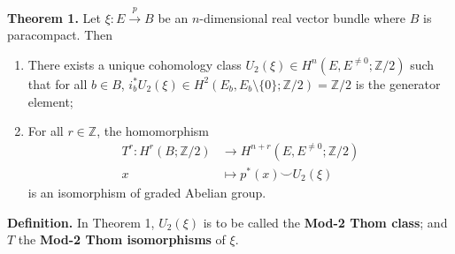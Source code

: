 \documentclass[10pt]{article}
\begin{document}
\textbf{Theorem 1.} Let $\xi:E\overset{p}{\to}B$ be an $n$-dimensional real vector bundle where $B$ is paracompact. Then
\begin{enumerate}
\item There exists a unique cohomology class $U_2(\xi)\in H^n(E,E^{\neq0};\mathbb{Z}/2)$ such that for all $b\in B$, $i_b^*U_2(\xi)\in H^2(E_b,E_b\setminus\{0\};\mathbb{Z}/2)=\mathbb{Z}/2$ is the generator element;
\item For all $r\in\mathbb{Z}$, the homomorphism
\begin{align*}
T^r:H^r(B;\mathbb{Z}/2)&\to H^{n+r}(E,E^{\neq0};\mathbb{Z}/2)\\x&\mapsto p^*(x)\smile U_2(\xi)
\end{align*}
is an isomorphism of graded Abelian group.
\end{enumerate}

\textbf{Definition.} In Theorem 1, $U_2(\xi)$ is to be called the \textbf{Mod-2 Thom class}; and $T$ the \textbf{Mod-2 Thom isomorphisms} of $\xi$.
\end{document}
